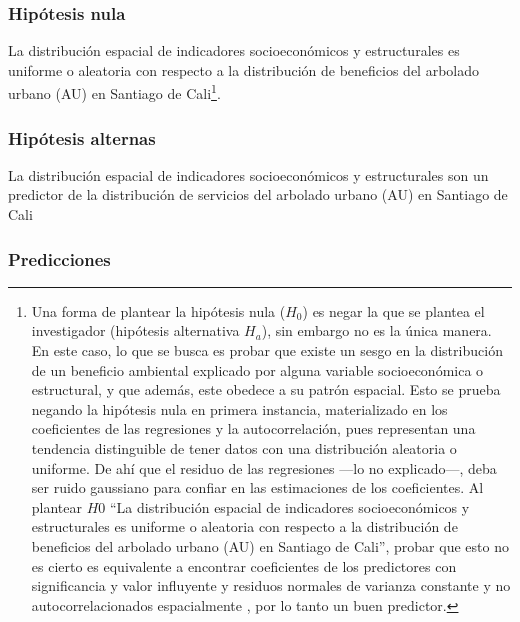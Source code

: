 \documentclass[12pt,a4paper,oneside, openany]{book}
\let\rmarkdownfootnote\footnote%
\def\footnote{\protect\rmarkdownfootnote}
\theoremstyle{definition}
\theoremstyle{definition}
\theoremstyle{definition}
\theoremstyle{remark}
\begin{document}
\subsubsection{Hipótesis nula}\label{hipuxf3tesis-nula}

La distribución espacial de indicadores socioeconómicos y estructurales
es uniforme o aleatoria con respecto a la distribución de beneficios del
arbolado urbano (AU) en Santiago de Cali\footnote{Una forma de plantear
  la hipótesis nula (\(H_0\)) es negar la que se plantea el investigador
  (hipótesis alternativa \(H_a\)), sin embargo no es la única manera. En
  este caso, lo que se busca es probar que existe un sesgo en la
  distribución de un beneficio ambiental explicado por alguna variable
  socioeconómica o estructural, y que además, este obedece a su patrón
  espacial. Esto se prueba negando la hipótesis nula en primera
  instancia, materializado en los coeficientes de las regresiones y la
  autocorrelación, pues representan una tendencia distinguible de tener
  datos con una distribución aleatoria o uniforme. De ahí que el residuo
  de las regresiones ---lo no explicado---, deba ser ruido gaussiano
  para confiar en las estimaciones de los coeficientes. Al plantear
  \(H0\) ``La distribución espacial de indicadores socioeconómicos y
  estructurales es uniforme o aleatoria con respecto a la distribución
  de beneficios del arbolado urbano (AU) en Santiago de Cali'', probar
  que esto no es cierto es equivalente a encontrar coeficientes de los
  predictores con significancia y valor influyente y residuos normales
  de varianza constante y no autocorrelacionados espacialmente , por lo
  tanto un buen predictor.}.

\subsubsection{Hipótesis alternas}\label{hipuxf3tesis-alternas}

La distribución espacial de indicadores socioeconómicos y estructurales
son un predictor de la distribución de servicios del arbolado urbano
(AU) en Santiago de Cali

\subsubsection{Predicciones}\label{predicciones}
\end{document}
